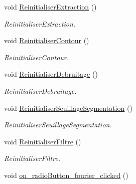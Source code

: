 \begin{DoxyCompactItemize}
\mbox{\label{classMainWindow_aa520f4402e8909e4915e0ba6f5bf31ba}} 
void \hyperlink{classMainWindow_aa520f4402e8909e4915e0ba6f5bf31ba}{Reinitialiser\+Extraction} ()
\begin{DoxyCompactList}\small\item\em Reinitialiser\+Extraction. \end{DoxyCompactList}\item 
\mbox{\label{classMainWindow_ae0d786ec22520c25dcd34dbca7e1469b}} 
void \hyperlink{classMainWindow_ae0d786ec22520c25dcd34dbca7e1469b}{Reinitialiser\+Contour} ()
\begin{DoxyCompactList}\small\item\em Reinitialiser\+Contour. \end{DoxyCompactList}\item 
\mbox{\label{classMainWindow_a6b8c6ba3326af79981bb6f8590080261}} 
void \hyperlink{classMainWindow_a6b8c6ba3326af79981bb6f8590080261}{Reinitialiser\+Debruitage} ()
\begin{DoxyCompactList}\small\item\em Reinitialiser\+Debruitage. \end{DoxyCompactList}\item 
\mbox{\label{classMainWindow_a3020a2c1b7baa34fe4efb1acc9b5ec9c}} 
void \hyperlink{classMainWindow_a3020a2c1b7baa34fe4efb1acc9b5ec9c}{Reinitialiser\+Seuillage\+Segmentation} ()
\begin{DoxyCompactList}\small\item\em Reinitialiser\+Seuillage\+Segmentation. \end{DoxyCompactList}\item 
\mbox{\label{classMainWindow_aba12787d81815d7519c98caae1f4d1cf}} 
void \hyperlink{classMainWindow_aba12787d81815d7519c98caae1f4d1cf}{Reinitialiser\+Filtre} ()
\begin{DoxyCompactList}\small\item\em Reinitialiser\+Filtre. \end{DoxyCompactList}\item 
\mbox{\label{classMainWindow_aa1da2bfa32a98ddfe7724f8b58d07dab}} 
void \hyperlink{classMainWindow_aa1da2bfa32a98ddfe7724f8b58d07dab}{on\+\_\+radio\+Button\+\_\+fourier\+\_\+clicked} ()

\end{DoxyCompactItemize}

